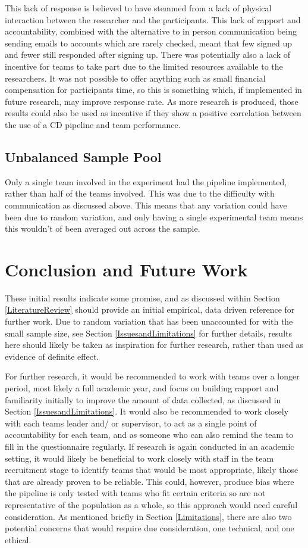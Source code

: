 \documentclass[journal]{IEEEtran}
\begin{document}
        This lack of response is believed to have stemmed from a lack of physical interaction between the researcher and the participants. This lack of rapport and accountability, combined with the alternative to in person communication being sending emails to accounts which are rarely checked, meant that few signed up and fewer still responded after signing up. There was potentially also a lack of incentive for teams to take part due to the limited resources available to the researchers. It was not possible to offer anything such as small financial compensation for participants time, so this is something which, if implemented in future research, may improve response rate. As more research is produced, those results could also be used as incentive if they show a positive correlation between the use of a CD pipeline and team performance.

    \subsection{Unbalanced Sample Pool}
        Only a single team involved in the experiment had the pipeline implemented, rather than half of the teams involved. This was due to the difficulty with communication as discussed above. This means that any variation could have been due to random variation, and only having a single experimental team means this wouldn't of been averaged out across the sample.

\section{Conclusion and Future Work} \label{conclusion}
    These initial results indicate some promise, and as discussed within Section \ref{LiteratureReview} should provide an initial empirical, data driven reference for further work. Due to random variation that has been unaccounted for with the small sample size, see Section \ref{IssuesandLimitations} for further details, results here should likely be taken as inspiration for further research, rather than used as evidence of definite effect. 

    For further research, it would be recommended to work with teams over a longer period, most likely a full academic year, and focus on building rapport and familiarity initially to improve the amount of data collected, as discussed in Section \ref{IssuesandLimitations}. It would also be recommended to work closely with each teams leader and/ or supervisor, to act as a single point of accountability for each team, and as someone who can also remind the team to fill in the questionnaire regularly. If research is again conducted in an academic setting, it would likely be beneficial to work closely with staff in the team recruitment stage to identify teams that would be most appropriate, likely those that are already proven to be reliable. This could, however, produce bias where the pipeline is only tested with teams who fit certain criteria so are not representative of the population as a whole, so this approach would need careful consideration. As mentioned briefly in Section \ref{Limitations}, there are also two potential concerns that would require due consideration, one technical, and one ethical.
\end{document}
